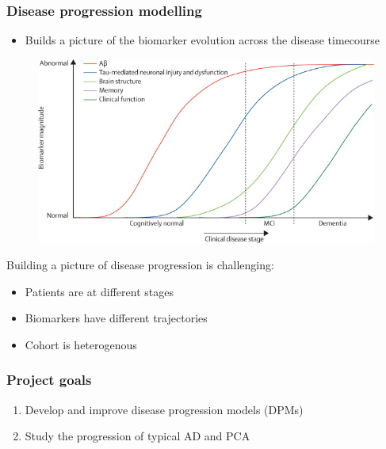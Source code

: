 \documentclass[10pt,xcolor=table]{beamer}
\begin{document}
\begin{frame}
\frametitle{Disease progression modelling}

\begin{itemize}
 \item Builds a picture of the biomarker evolution across the disease timecourse
\end{itemize}


\begin{figure}
\centering 
\vspace{1em}
\includegraphics[scale=0.5]{jack_curves.jpg}
\end{figure}

Building a picture of disease progression is challenging:
\begin{itemize}
 \item Patients are at different stages
 \item Biomarkers have different trajectories
 \item Cohort is heterogenous
\end{itemize}


\end{frame}


\begin{frame}
\frametitle{Project goals}

\begin{enumerate}
 \item Develop and improve disease progression models (DPMs)
 \item Study the progression of typical AD and PCA
\end{enumerate}

\end{frame}
\end{document}
